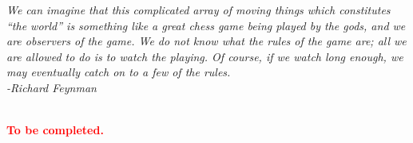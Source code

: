 \begin{minipage}{0.7\textwidth}
\small
			\textit{We can imagine that this complicated array of moving things which constitutes “the world” is something like a great chess game being played by the gods, and we are observers of the game. We do not know what the rules of the game are; all we are allowed to do is to watch the playing. Of course, if we watch long enough, we may eventually catch on to a few of the rules.
            \\[1.5ex]
            -Richard Feynman}
\end{minipage}
\\[2.5ex]
\textcolor{red}{\textbf{To be completed.}}
